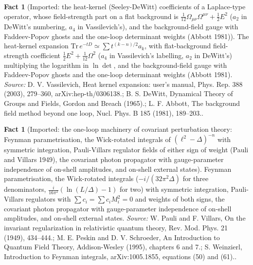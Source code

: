 \documentclass[11pt]{article}
\theoremstyle{definition}
\newtheorem{fact}[theorem]{Fact}
\theoremstyle{plain}
\begin{document}
\begin{fact}[Imported: the heat-kernel (Seeley-DeWitt) coefficients of a Laplace-type operator, whose field-strength part on a flat background is $\tfrac{1}{12}\Omega_{\mu\nu}\Omega^{\mu\nu} + \tfrac12E^{2}$ ($a_{2}$ in DeWitt's numbering, $a_{4}$ in Vassilevich's), and the background-field gauge with Faddeev-Popov ghosts and the one-loop determinant weights (Abbott 1981)]\label{c:synthesis.imported-heat-kernel-coefficients-and-background-field-gauge}
The heat-kernel expansion $\mathrm{Tr}\,e^{-tD} \simeq \sum t^{(k-n)/2}a_{k}$, with flat-background field-strength coefficient $\tfrac12E^{2} + \tfrac1{12}\Omega^{2}$ ($a_{4}$ in Vassilevich's labelling, $a_{2}$ in DeWitt's) multiplying the logarithm in $\ln\det$, and the background-field gauge with Faddeev-Popov ghosts and the one-loop determinant weights (Abbott 1981).
\emph{Source:} D. V. Vassilevich, Heat kernel expansion: user's manual, Phys. Rep. 388 (2003), 279--360, arXiv:hep-th/0306138.; B. S. DeWitt, Dynamical Theory of Groups and Fields, Gordon and Breach (1965).; L. F. Abbott, The background field method beyond one loop, Nucl. Phys. B 185 (1981), 189--203..
\end{fact}

\begin{fact}[Imported: the one-loop machinery of covariant perturbation theory: Feynman parametrisation, the Wick-rotated integrals of $(\ell^{2} - \Delta)^{-n}$ with symmetric integration, Pauli-Villars regulator fields of either sign of weight (Pauli and Villars 1949), the covariant photon propagator with gauge-parameter independence of on-shell amplitudes, and on-shell external states]\label{c:synthesis.imported-one-loop-integrals-and-pauli-villars-regulators}
Feynman parametrisation, the Wick-rotated integrals ($-i/(32\pi^{2}\Delta)$ for three denominators, $\tfrac{i}{16\pi^{2}}(\ln(L/\Delta) - 1)$ for two) with symmetric integration, Pauli-Villars regulators with $\sum c_{i} = \sum c_{i}M_{i}^{2} = 0$ and weights of both signs, the covariant photon propagator with gauge-parameter independence of on-shell amplitudes, and on-shell external states.
\emph{Source:} W. Pauli and F. Villars, On the invariant regularization in relativistic quantum theory, Rev. Mod. Phys. 21 (1949), 434--444.; M. E. Peskin and D. V. Schroeder, An Introduction to Quantum Field Theory, Addison-Wesley (1995), chapters 6 and 7.; S. Weinzierl, Introduction to Feynman integrals, arXiv:1005.1855, equations (50) and (61)..
\end{fact}
\end{document}
